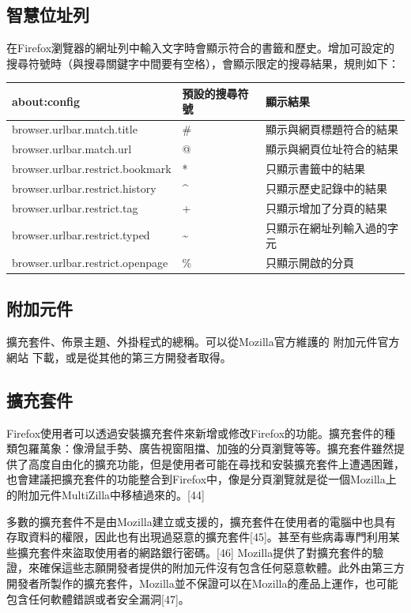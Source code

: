 \documentclass[12pt, a4paper, twoside]{article}
\begin{document}
\subsection{智慧位址列}

在Firefox瀏覽器的網址列中輸入文字時會顯示符合的書籤和歷史。增加可設定的搜尋符號時（與搜尋關鍵字中間要有空格），會顯示限定的搜尋結果，規則如下：

\begin{adjustbox}{center}
\footnotesize\linespread{1.2}\centering\begin{tabular}{lll} \hline
about:config &  預設的搜尋符號 & 顯示結果\\ \hline
browser.urlbar.match.title & \# & 顯示與網頁標題符合的結果\\
browser.urlbar.match.url & @ & 顯示與網頁位址符合的結果\\
browser.urlbar.restrict.bookmark & * & 只顯示書籤中的結果\\
browser.urlbar.restrict.history & \^{} & 只顯示歷史記錄中的結果\\
browser.urlbar.restrict.tag & + & 只顯示增加了分頁的結果\\
browser.urlbar.restrict.typed & \~{} & 只顯示在網址列輸入過的字元\\
browser.urlbar.restrict.openpage & \% & 只顯示開啟的分頁\\ \hline
\end{tabular}
\end{adjustbox}

\subsection{附加元件}

擴充套件、佈景主題、外掛程式的總稱。可以從Mozilla官方維護的 附加元件官方網站 下載，或是從其他的第三方開發者取得。

\subsection{擴充套件}

Firefox使用者可以透過安裝擴充套件來新增或修改Firefox的功能。擴充套件的種類包羅萬象：像滑鼠手勢、廣告視窗阻擋、加強的分頁瀏覽等等。擴充套件雖然提供了高度自由化的擴充功能，但是使用者可能在尋找和安裝擴充套件上遭遇困難，也會建議把擴充套件的功能整合到Firefox中，像是分頁瀏覽就是從一個Mozilla上的附加元件MultiZilla中移植過來的。[44]

多數的擴充套件不是由Mozilla建立或支援的，擴充套件在使用者的電腦中也具有存取資料的權限，因此也有出現過惡意的擴充套件[45]。甚至有些病毒專門利用某些擴充套件來盜取使用者的網路銀行密碼。[46] Mozilla提供了對擴充套件的驗證，來確保這些志願開發者提供的附加元件沒有包含任何惡意軟體。此外由第三方開發者所製作的擴充套件，Mozilla並不保證可以在Mozilla的產品上運作，也可能包含任何軟體錯誤或者安全漏洞[47]。
\end{document}

